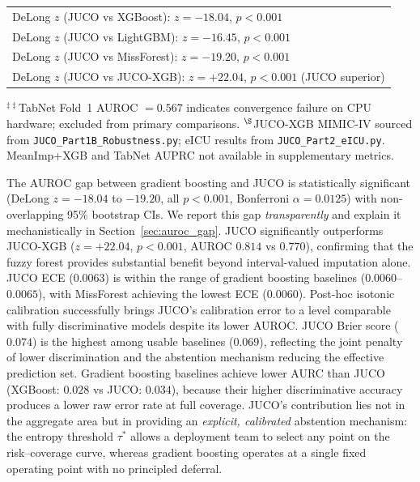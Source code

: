 \documentclass[a4paper,fleqn,longmktitle]{cas-sc}
\begin{document}
\begin{table}[h]
{\begin{tabular}{lccccccc}
			\midrule
			\multicolumn{8}{l}{\small DeLong $z$ (JUCO vs XGBoost): $z = -18.04$, $p < 0.001$} \\
			\multicolumn{8}{l}{\small DeLong $z$ (JUCO vs LightGBM): $z = -16.45$, $p < 0.001$} \\
			\multicolumn{8}{l}{\small DeLong $z$ (JUCO vs MissForest): $z = -19.20$, $p < 0.001$} \\
			\multicolumn{8}{l}{\small DeLong $z$ (JUCO vs JUCO-XGB): $z = +22.04$, $p < 0.001$ (JUCO superior)} \\
			\bottomrule
		\end{tabular}}
		\par\smallskip
		\raggedright\footnotesize
		$^{\ddagger\ddagger}$TabNet Fold~1 AUROC $= 0.567$ indicates convergence
		failure on CPU hardware; excluded from primary comparisons.
		$^{\S}$JUCO-XGB MIMIC-IV sourced from \texttt{JUCO\_Part1B\_Robustness.py};
		eICU results from \texttt{JUCO\_Part2\_eICU.py}.
		MeanImp+XGB and TabNet AUPRC not available in supplementary metrics.
	\end{table}
\vspace{10pt}
	The AUROC gap between gradient boosting and JUCO is statistically
	significant (DeLong $z = -18.04$ to $-19.20$, all $p < 0.001$,
	Bonferroni $\alpha = 0.0125$) with non-overlapping 95\% bootstrap CIs.
	We report this gap \emph{transparently} and explain it mechanistically
	in Section~\ref{sec:auroc_gap}.
	JUCO significantly outperforms JUCO-XGB
	($z = +22.04$, $p < 0.001$, AUROC $0.814$ vs $0.770$),
	confirming that the fuzzy forest provides substantial benefit beyond
	interval-valued imputation alone.
	JUCO ECE ($0.0063$) is within the range of gradient boosting
	baselines ($0.0060$--$0.0065$), with MissForest achieving the
	lowest ECE ($0.0060$). Post-hoc isotonic calibration successfully
	brings JUCO's calibration error to a level comparable with
	fully discriminative models despite its lower AUROC.
	JUCO Brier score ($0.074$) is the highest among usable baselines
	($0.069$), reflecting the joint penalty of lower discrimination
	and the abstention mechanism reducing the effective prediction set.
	Gradient boosting baselines achieve lower AURC than JUCO
	(XGBoost: $0.028$ vs JUCO: $0.034$), because their higher
	discriminative accuracy produces a lower raw error rate at full coverage.
	JUCO's contribution lies not in the aggregate area but in
	providing an \emph{explicit, calibrated} abstention mechanism:
	the entropy threshold $\tau^*$ allows a deployment team to
	select any point on the risk--coverage curve, whereas gradient
	boosting operates at a single fixed operating point with no
	principled deferral.
	\vspace{1000pt}
\end{document}
